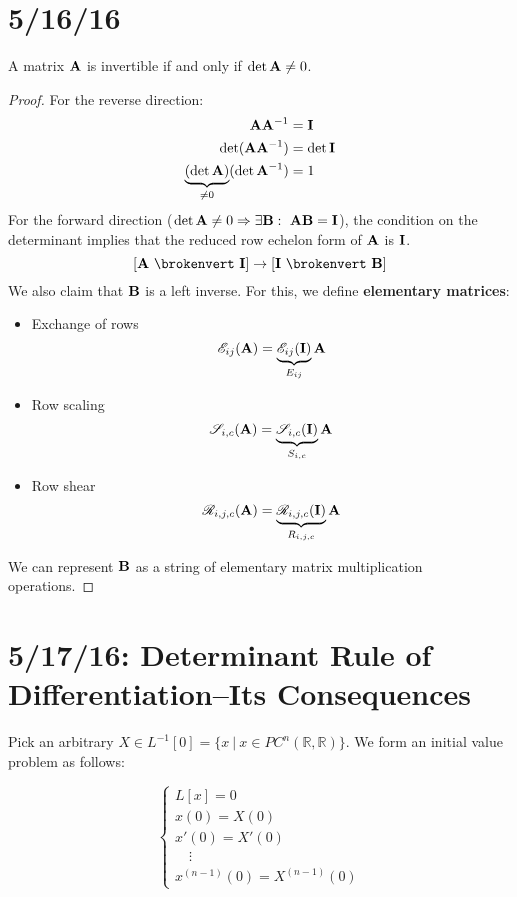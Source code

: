 \documentclass[12pt]{article}
\begin{document}
\section{5/16/16}

\begin{theorem}
A matrix ${\bf A}$ is invertible if and only if $\det{\bf A} \neq 0$.
\end{theorem}

\begin{proof}
For the reverse direction:
\[
\begin{aligned}
  {\bf A}{\bf A}^{-1} &= {\bf I} \\
  \det({\bf A}{\bf A}^{-1}) &= \det{\bf I} \\
  \underbrace{(\det{\bf A})}_{\neq 0}(\det{\bf A}^{-1}) &= 1
\end{aligned}
\]
For the forward direction ($\det{\bf A} \neq 0 \Rightarrow \exists {\bf B} : \ {\bf A}{\bf B} = {\bf I}$), the condition on the determinant implies that the reduced row echelon form of ${\bf A}$ is ${\bf I}$. \[ [{\bf A} \ \brokenvert \ {\bf I}] \to [{\bf I} \ \brokenvert \ {\bf B}] \]
We also claim that ${\bf B}$ is a left inverse. For this, we define \textbf{elementary matrices}:
\begin{itemize}
\item Exchange of rows \[ \mathscr{E}_{ij}({\bf A}) = \underbrace{\mathscr{E}_{ij}({\bf I})}_{E_{ij}}{\bf A} \]
\item Row scaling \[ \mathscr{S}_{i,c}({\bf A}) = \underbrace{\mathscr{S}_{i,c}({\bf I})}_{S_{i,c}}{\bf A} \]
\item Row shear \[ \mathscr{R}_{i,j,c}({\bf A}) = \underbrace{\mathscr{R}_{i,j,c}({\bf I})}_{R_{i,j,c}}{\bf A} \]
\end{itemize}

We can represent ${\bf B}$ as a string of elementary matrix multiplication operations.
\end{proof}

\section{5/17/16: Determinant Rule of Differentiation--Its Consequences}

Pick an arbitrary $X \in L^{-1}[0] = \{x \ | \ x \in PC^n(\mathbb{R},\mathbb{R})\}$. We form an initial value problem as follows:

\[ 
\begin{cases}
  L[x] = 0 \\
  x(0) = X(0) \\
  x'(0) = X'(0) \\
  \quad \vdots \\
  x^{(n-1)}(0) = X^{(n-1)}(0)
\end{cases}
\]
\end{document}
